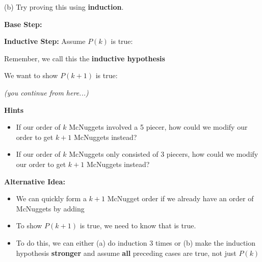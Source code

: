\documentclass[fleqn]{article}
\theoremstyle{definition}
\begin{document}
\vspace{.25cm}
(b) Try proving this using \textbf{induction}. 

\vspace{.25cm}
\textbf{Base Step:}

\vspace{1.5cm}
\textbf{Inductive Step:} Assume $P(k)$ is true: \underline{\hspace{10cm}}

\vspace{.25cm}
    \hspace{1cm} Remember, we call this the \textbf{inductive hypothesis}

\vspace{.5cm}
We want to show $P(k+1)$ is true: \underline{\hspace{10cm}}

\vspace{.25cm}
    \hspace{1cm} {\it (you continue from here...)}



\newpage


\textbf{Hints}
    \begin{itemize}
    \item If our order of $k$ McNuggets involved a 5 piecer, how could we modify our order to get $k+1$ McNuggets instead?

    \vspace{2cm}
    \item If our order of $k$ McNuggets only consisted of 3 piecers, how could we modify our order to get $k+1$ McNuggets instead? 
    \end{itemize}

    \vspace{2cm}

\textbf{Alternative Idea:}

\vspace{.25cm}
    \begin{itemize}
    \item We can quickly form a $k+1$ McNugget order if we already have an order of  \underline{\hspace{2cm}} McNuggets by adding 

    \vspace{.25cm}
    \underline{\hspace{4cm}}
    
    \vspace{.25cm}
    \item To show $P(k+1)$ is true, we need to know that \underline{\hspace{2cm}} is true. 
    
    \vspace{.25cm}
    \item To do this, we can either (a) do induction 3 times or (b) make the induction hypothesis \textbf{stronger} and assume \textbf{all} preceding cases are true, not just $P(k)$
    \end{itemize}
\end{document}
